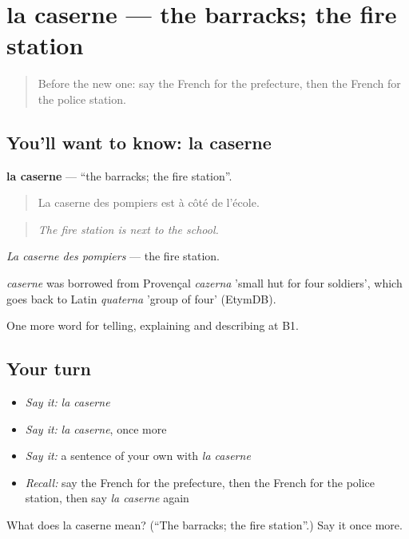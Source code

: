 \section[la caserne]{la caserne — the barracks; the fire station}

\label{lesson:FR-C440-caserne}



\begin{quote}
Before the new one: say the French for the prefecture, then the French for the police station.
\end{quote}

\subsection*{You'll want to know: la caserne}
\textbf{la caserne} — \textquotedblleft{}the barracks; the fire station\textquotedblright{}.

\begin{quote}
La caserne des pompiers est à côté de l'école.
\end{quote}

\begin{quote}
\emph{The fire station is next to the school.}
\end{quote}

\emph{La caserne des pompiers} — the fire station.

\begin{cousinweb}
\emph{caserne} was borrowed from Provençal \emph{cazerna} 'small hut for four soldiers', which goes back to Latin \emph{quaterna} 'group of four' (EtymDB).
\end{cousinweb}

\begin{grammarlens}[title={What you've built}]
One more word for telling, explaining and describing at B1.
\end{grammarlens}

\subsection*{Your turn}
\begin{itemize}
\raggedright
  \item \emph{Say it:} \emph{la caserne}
  \item \emph{Say it:} \emph{la caserne}, once more
  \item \emph{Say it:} a sentence of your own with \emph{la caserne}
  \item \emph{Recall:} say the French for the prefecture, then the French for the police station, then say \emph{la caserne} again
\end{itemize}

\begin{tcolorbox}[breakable,colback=teal!4,colframe=teal!35!black,title={Before you move on}]
What does la caserne mean? (\textquotedblleft{}The barracks; the fire station\textquotedblright{}.) Say it once more.
\end{tcolorbox}
